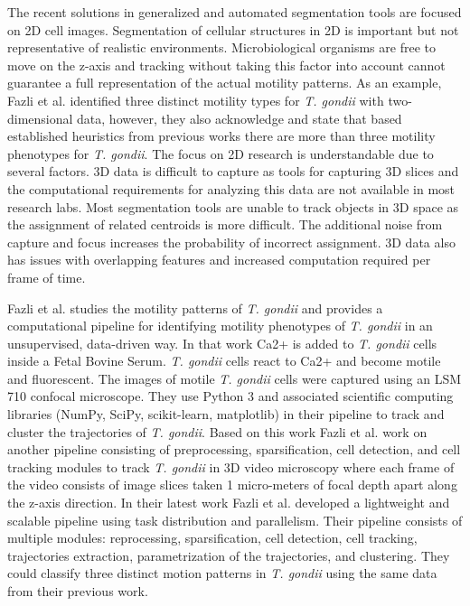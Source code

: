 \documentclass[./dissertation.tex]{subfiles}
\begin{document}
The recent solutions in generalized and automated segmentation tools are focused on 2D cell images. Segmentation of cellular structures in 2D is important but not representative of realistic environments. Microbiological organisms are free to move on the z-axis and tracking without taking this factor into account cannot guarantee a full representation of the actual motility patterns. As an example, Fazli et al. \cite{fazli2018unsupervised} identified three distinct motility types for \textit{T. gondii} with two-dimensional data, however, they also acknowledge and state that based established heuristics from previous works there are more than three motility phenotypes for \textit{T. gondii}. The focus on 2D research is understandable due to several factors. 3D data is difficult to capture as tools for capturing 3D slices and the computational requirements for analyzing this data are not available in most research labs. Most segmentation tools are unable to track objects in 3D space as the assignment of related centroids is more difficult. The additional noise from capture and focus increases the probability of incorrect assignment. 3D data also has issues with overlapping features and increased computation required per frame of time.

Fazli et al. \cite{fazli2018unsupervised} studies the motility patterns of \textit{T. gondii} and provides a computational pipeline for identifying motility phenotypes of \textit{T. gondii} in an unsupervised, data-driven way. In that work Ca2+ is added to \textit{T. gondii} cells inside a Fetal Bovine Serum. \textit{T. gondii} cells react to Ca2+ and become motile and fluorescent. The images of motile \textit{T. gondii} cells were captured using an LSM 710 confocal microscope. They use Python 3 and associated scientific computing libraries (NumPy, SciPy, scikit-learn, matplotlib) in their pipeline to track and cluster the trajectories of \textit{T. gondii}. Based on this work Fazli et al. \cite{fazli2018toward} work on another pipeline consisting of preprocessing, sparsification, cell detection, and cell tracking modules to track \textit{T. gondii} in 3D video microscopy where each frame of the video consists of image slices taken 1 micro-meters of focal depth apart along the z-axis direction. In their latest work Fazli et al. \cite{fazli2019lightweight} developed a lightweight and scalable pipeline using task distribution and parallelism. Their pipeline consists of multiple modules: reprocessing, sparsification, cell detection, cell tracking, trajectories extraction, parametrization of the trajectories, and clustering. They could classify three distinct motion patterns in \textit{T. gondii} using the same data from their previous work.
\end{document}
